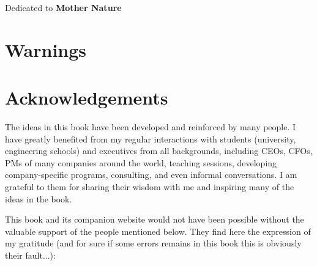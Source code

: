 \documentclass[12pt,a4paper,twoside,openright]{report}
\theoremstyle{definition}
\theoremstyle{itexmp}
\numberwithin{equation}{section}
\newenvironment{dedication}
  {\clearpage           %
   \thispagestyle{empty}%
   \vspace*{\stretch{1}}%
   \itshape             %
   \raggedleft          %
  }
  {\par %
   \vspace{\stretch{3}} %
   \clearpage           %
  }
\begin{document}
	\newpage\null\thispagestyle{empty}\newpage %
	\dominitoc
	\pagebreak
	\renewcommand{\contentsname}{Table of Contents}
	\tableofcontents
	\newpage\null\thispagestyle{empty}\newpage
	\setlength{\parskip}{12pt}
	\clearpage %
	\pagestyle{fancy} %
	\renewcommand{\chaptermark}[1]{\markboth{\thechapter.\space#1}{}}
	\renewcommand{\sectionmark}[1]{\markright{#1}}
	\fancyhead[LE,RO]{\nouppercase\leftmark~(\nouppercase\rightmark)} %
	\renewcommand{\footrulewidth}{1pt}
	\fancyfoot[C]{}
	\let\cleardoublepage\clearpage

	\begin{dedication}
	{\LARGE Dedicated to \textbf{Mother Nature}}
	\end{dedication}

	\chapter{Warnings}
	\minitoc
	
	
	
	\chapter{Acknowledgements}

	The ideas in this book have been developed and reinforced by many people. I have greatly benefited from my regular interactions with  students (university, engineering schools) and executives from all backgrounds, including CEOs, CFOs, PMs of many companies around the world, teaching sessions, developing company-specific programs, consulting, and even informal conversations. I am grateful to them for sharing their wisdom with me and inspiring many of the ideas in the book.

	This book and its companion website would not have been possible without the valuable support of the people mentioned below. They find here the expression of my gratitude (and for sure if some errors remains in this book this is obviously their fault...):
	
\end{document}

